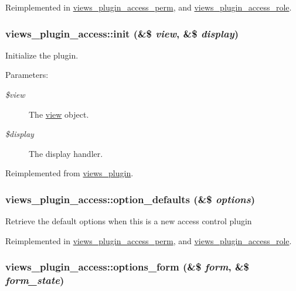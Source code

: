 Reimplemented in \hyperlink{classviews__plugin__access__perm_c9dce994826265f48711a23cf3f2414f}{views\_\-plugin\_\-access\_\-perm}, and \hyperlink{classviews__plugin__access__role_50094384e297acdd629d9462004df69a}{views\_\-plugin\_\-access\_\-role}.\hypertarget{classviews__plugin__access_1b295cea820f403d1e361e7de4e3800e}{
\subsubsection[{init}]{\setlength{\rightskip}{0pt plus 5cm}views\_\-plugin\_\-access::init (\&\$ {\em view}, \/  \&\$ {\em display})}}
\label{classviews__plugin__access_1b295cea820f403d1e361e7de4e3800e}


Initialize the plugin.

\begin{Desc}
\item[Parameters:]
\begin{description}
\item[{\em \$view}]The \hyperlink{classview}{view} object. \item[{\em \$display}]The display handler. \end{description}
\end{Desc}


Reimplemented from \hyperlink{classviews__plugin_d6545806f1390625286446b426f1a489}{views\_\-plugin}.\hypertarget{classviews__plugin__access_6e5248925c3c3a8059e0a7121bc6777b}{
\subsubsection[{option\_\-defaults}]{\setlength{\rightskip}{0pt plus 5cm}views\_\-plugin\_\-access::option\_\-defaults (\&\$ {\em options})}}
\label{classviews__plugin__access_6e5248925c3c3a8059e0a7121bc6777b}


Retrieve the default options when this is a new access control plugin 

Reimplemented in \hyperlink{classviews__plugin__access__perm_5c87d379496d4e48b22f0cfe8353a2e1}{views\_\-plugin\_\-access\_\-perm}, and \hyperlink{classviews__plugin__access__role_337043de2f34f2e861058d3584286499}{views\_\-plugin\_\-access\_\-role}.\hypertarget{classviews__plugin__access_530865442ea42db5e720e6c49f3d16f2}{
\subsubsection[{options\_\-form}]{\setlength{\rightskip}{0pt plus 5cm}views\_\-plugin\_\-access::options\_\-form (\&\$ {\em form}, \/  \&\$ {\em form\_\-state})}}
\label{classviews__plugin__access_530865442ea42db5e720e6c49f3d16f2}


